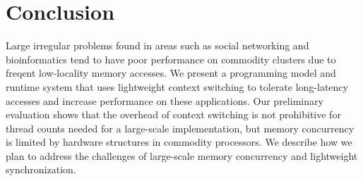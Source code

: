 \documentclass{acm_proc_article-sp}
\begin{document}
\section{Conclusion}

Large irregular problems found in areas such as social networking and
bioinformatics tend to have poor performance on commodity clusters due
to freqent low-locality memory accesses. We present a programming
model and runtime system that uses lightweight context switching to
tolerate long-latency accesses and increase performance on these
applications. Our preliminary evaluation shows that the overhead of
context switching is not prohibitive for thread counts needed for a
large-scale implementation, but memory concurrency is limited by
hardware structures in commodity processors. We describe how we plan
to address the challenges of large-scale memory concurrency and
lightweight synchronization.




\end{document}
